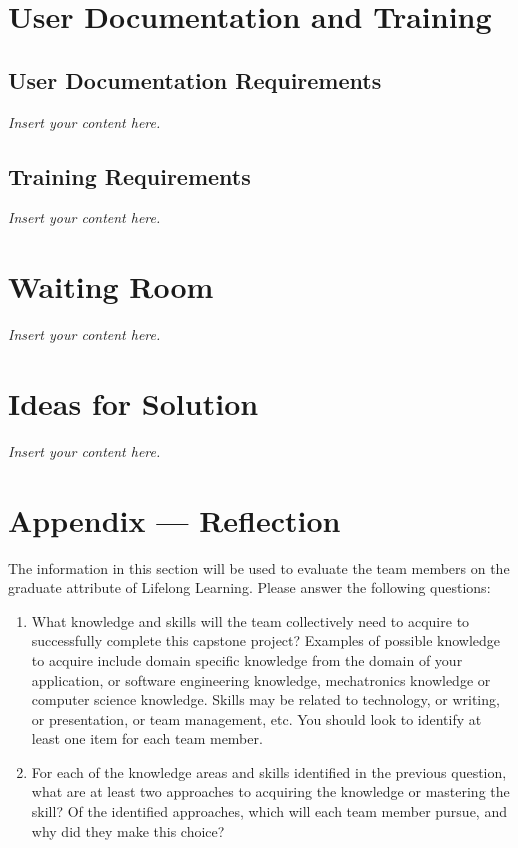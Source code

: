 \documentclass[12pt]{article}
\newcommand{\lips}{\textit{Insert your content here.}}
\begin{document}
\section{User Documentation and Training}
\subsection{User Documentation Requirements}
\lips
\subsection{Training Requirements}
\lips

\section{Waiting Room}
\lips

\section{Ideas for Solution}
\lips

\newpage{}
\section*{Appendix --- Reflection}

The information in this section will be used to evaluate the team members on the
graduate attribute of Lifelong Learning.  Please answer the following questions:

\begin{enumerate}
  \item What knowledge and skills will the team collectively need to acquire to
  successfully complete this capstone project?  Examples of possible knowledge
  to acquire include domain specific knowledge from the domain of your
  application, or software engineering knowledge, mechatronics knowledge or
  computer science knowledge.  Skills may be related to technology, or writing,
  or presentation, or team management, etc.  You should look to identify at
  least one item for each team member.
  \item For each of the knowledge areas and skills identified in the previous
  question, what are at least two approaches to acquiring the knowledge or
  mastering the skill?  Of the identified approaches, which will each team
  member pursue, and why did they make this choice?
\end{enumerate}
\end{document}
